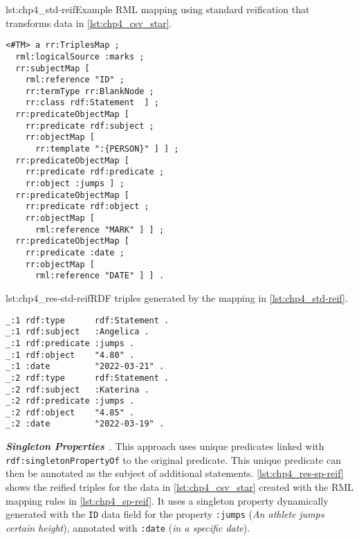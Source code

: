 \begin{minipage}{\linewidth}
\begin{captionedlisting}{lst:chp4_std-reif}{Example RML mapping using standard reification that transforms data in \cref{lst:chp4_csv_star}.}
\centering
\begin{multicols}{2}
{\begin{lstlisting}[basicstyle=\ttfamily\small,label={list:example1},columns=flexible]
<#TM> a rr:TriplesMap ;
  rml:logicalSource :marks ;
  rr:subjectMap [ 
    rml:reference "ID" ;
    rr:termType rr:BlankNode ;
    rr:class rdf:Statement  ] ;
  rr:predicateObjectMap [ 
    rr:predicate rdf:subject ;
    rr:objectMap [
      rr:template ":{PERSON}" ] ] ;
  rr:predicateObjectMap [ 
    rr:predicate rdf:predicate ;
    rr:object :jumps ] ;
  rr:predicateObjectMap [ 
    rr:predicate rdf:object ;
    rr:objectMap [
      rml:reference "MARK" ] ] ;
  rr:predicateObjectMap [ 
    rr:predicate :date ;
    rr:objectMap [
      rml:reference "DATE" ] ] .
\end{lstlisting}}
\end{multicols}
\end{captionedlisting}
\end{minipage}

\begin{minipage}{\linewidth}
\begin{captionedlisting}{lst:chp4_res-std-reif}{RDF triples generated by the mapping in \cref{lst:chp4_std-reif}.}
\centering
\begin{multicols}{2}
{\begin{lstlisting}[basicstyle=\ttfamily\small,label={list:example1},columns=flexible]
_:1 rdf:type      rdf:Statement .
_:1 rdf:subject   :Angelica .
_:1 rdf:predicate :jumps .
_:1 rdf:object    "4.80" .
_:1 :date         "2022-03-21" .
_:2 rdf:type      rdf:Statement .
_:2 rdf:subject   :Katerina .
_:2 rdf:predicate :jumps .
_:2 rdf:object    "4.85" .
_:2 :date         "2022-03-19" .
\end{lstlisting}}
\end{multicols}
\end{captionedlisting}
\end{minipage}



\noindent\textbf{\textit{Singleton Properties}}~\citep{nguyen2014don}. This approach uses unique predicates linked with \texttt{rdf:singletonPropertyOf} to the original predicate. 
This unique predicate can then be annotated as the subject of additional statements. 
\cref{lst:chp4_res-sp-reif} shows the reified triples for the data in \cref{lst:chp4_csv_star} created with the RML mapping rules in \cref{lst:chp4_sp-reif}. 
It uses a singleton property dynamically generated with the \texttt{ID} data field for the property \texttt{:jumps} (\textit{An athlete jumps certain height}), annotated with \texttt{:date} (\textit{in a specific date}).


